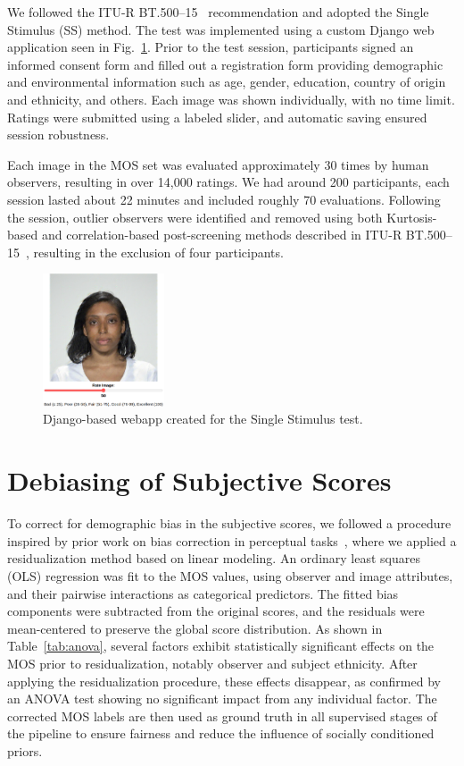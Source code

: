 We followed the ITU-R BT.500--15~\cite{ITU-R-BT500} recommendation and adopted the Single Stimulus (SS) method. The test was implemented using a custom Django web application seen in Fig.~\ref{fig:webapp}. Prior to the test session, participants signed an informed consent form and filled out a registration form providing demographic and environmental information such as age, gender, education, country of origin and ethnicity, and others. Each image was shown individually, with no time limit. Ratings were submitted using a labeled slider, and automatic saving ensured session robustness.

Each image in the MOS set was evaluated approximately 30 times by human observers, resulting in over 14,000 ratings. We had around 200 participants, each session lasted about 22 minutes and included roughly 70 evaluations. Following the session, outlier observers were identified and removed using both Kurtosis-based and correlation-based post-screening methods described in ITU-R BT.500--15~\cite{ITU-R-BT500}, resulting in the exclusion of four participants.

\begin{figure}
    \centering
    \includegraphics[width=0.32\textwidth]{images/webapp_test.png}
    \caption{Django-based webapp created for the Single Stimulus test.}\label{fig:webapp}
\end{figure}

\section{Debiasing of Subjective Scores}

To correct for demographic bias in the subjective scores, we followed a procedure inspired by prior work on bias correction in perceptual tasks~\cite{clapes2018apparent}, where we applied a residualization method based on linear modeling. An ordinary least squares (OLS) regression was fit to the MOS values, using observer and image attributes, and their pairwise interactions as categorical predictors. The fitted bias components were subtracted from the original scores, and the residuals were mean-centered to preserve the global score distribution. As shown in Table~\ref{tab:anova}, several factors exhibit statistically significant effects on the MOS prior to residualization, notably observer and subject ethnicity. After applying the residualization procedure, these effects disappear, as confirmed by an ANOVA test showing no significant impact from any individual factor. The corrected MOS labels are then used as ground truth in all supervised stages of the pipeline to ensure fairness and reduce the influence of socially conditioned priors.

